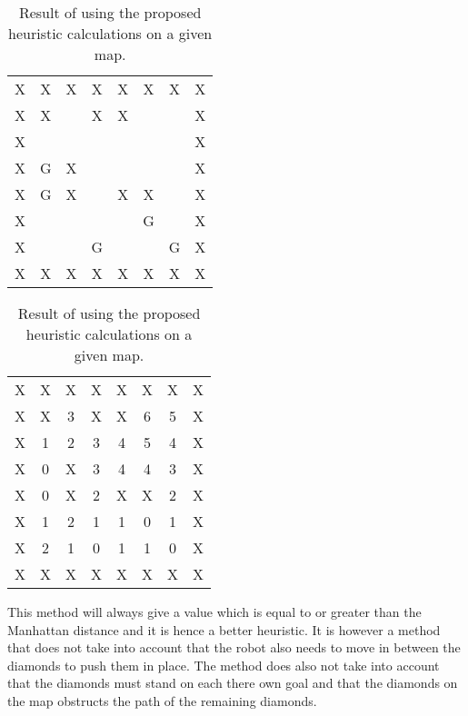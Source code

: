 \begin{table}[H]
\begin{subtable}{.5\linewidth}
\centering
\begin{tabular}{| *{8}{c} |}
\hline
X & X & X & X & X & X & X & X \\
X & X &   & X & X &   &   & X \\
X &   &   &   &   &   &   & X \\
X & G & X &   &   &   &   & X \\
X & G & X &   & X & X &   & X \\
X &   &   &   &   & G &   & X \\
X &   &   & G &   &   & G & X \\
X & X & X & X & X & X & X & X \\
\hline
\end{tabular}
\caption{Original test map.}
\label{fig:orig_testmap}
\end{subtable}
%
\begin{subtable}{.5\linewidth}
\centering
\begin{tabular}{| *{8}{c} |}
\hline
X & X & X & X & X & X & X & X \\
X & X & 3 & X & X & 6 & 5 & X \\
X & 1 & 2 & 3 & 4 & 5 & 4 & X \\
X & 0 & X & 3 & 4 & 4 & 3 & X \\
X & 0 & X & 2 & X & X & 2 & X \\
X & 1 & 2 & 1 & 1 & 0 & 1 & X \\
X & 2 & 1 & 0 & 1 & 1 & 0 & X \\
X & X & X & X & X & X & X & X \\
\hline
\end{tabular}
\caption{Cost test map.}
\label{fig:orig_costmap}
\end{subtable}
\caption{Result of using the proposed heuristic calculations on a given map.}
\end{table}

This method will always give a value which is equal to or greater than the Manhattan distance and it is hence a better heuristic.
It is however a method that does not take into account that the robot also needs to move in between the diamonds to push them in place.
The method does also not take into account that the diamonds must stand on each there own goal and that the diamonds on the map obstructs the path of the remaining diamonds.